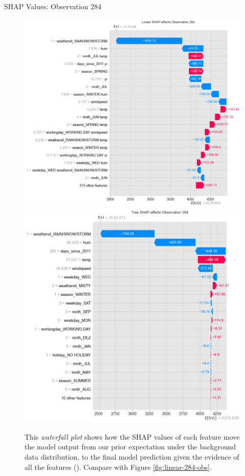 \documentclass[10pt]{beamer}
\begin{document}
\begin{frame}{SHAP Values: Observation 284}
\begin{center}
  \begin{figure}
    \includegraphics[scale=0.19]{images/interpretable_ml_122_0.png}
    \includegraphics[scale=0.19]{images/interpretable_ml_134_0.png}
    \caption{This {\em waterfall plot} shows how the SHAP values of each feature move the model output from our prior expectation under the background data distribution, to the final model prediction given the evidence of all the features (\cite{NIPS2017_7062}). Compare with Figure \ref{fig:linear-284-obs}.}
  \end{figure}
\end{center}
\end{frame}
\end{document}
